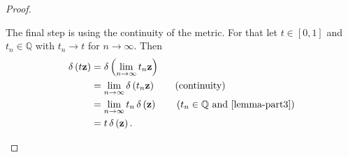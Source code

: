 \begin{proof}

	\begin{proofpart}[$t \metro{\z} = \metro{t \z}$ for $t \in {[0, 1]}$]
		The final step is using the continuity of the metric. For that let $t \in [0,1]$ and $t_n \in \mathbb{Q}$ with $t_n \rightarrow t$ for $n \rightarrow \infty$. Then
		\begin{align*}
			\metro{t \z} & = \metro{ \lim_{n \rightarrow \infty } t_n \z }                                                 \\
			             & = \lim_{n \rightarrow \infty } \metro{t_n \z} \tag{continuity}                                  \\
			             & = \lim_{n \rightarrow \infty } t_n \metro{\z} \tag{$t_n \in \mathbb{Q}$ and \cref{lemma-part3}} \\
			             & = t \metro{\z}.
		\end{align*}
	\end{proofpart}
\end{proof}


